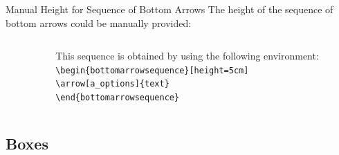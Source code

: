 \documentclass[english,sectioncirclenumberstyle]{ciadbeamer}
\begin{document}
\begin{frame}[t]{{Manual Height} for Sequence of Bottom Arrows}
	The height of the sequence of bottom arrows could be manually provided:
	\vspace{.5cm}
	\begin{columns}
		\begin{column}{.2\linewidth}
			\begin{bottomarrowsequence}[height=5cm]
			\end{bottomarrowsequence} \\[.5cm]
		\end{column}
		\begin{column}{.8\linewidth}
			This sequence is obtained by using the following environment: \\
			\texttt{{\textbackslash}begin\{bottomarrowsequence\}[height=5cm]} \\
			\hspace{.5cm}\texttt{{\textbackslash}arrow[a\_options]\{text\}} \\
			\texttt{{\textbackslash}end\{bottomarrowsequence\}}
		\end{column}
	\end{columns}
\end{frame}

\subsection{Boxes}
\subsectiontableofcontentslide
\end{document}
